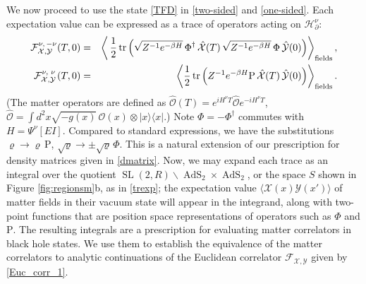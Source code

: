 \documentclass[11pt]{article}
\newcommand{\bea}{\begin{eqnarray}}
\newcommand{\eea}{\end{eqnarray}}
\newcommand{\lt}{\left}
\newcommand{\rt}{\right}
\newcommand*{\bra}[1]{\langle{#1}|}
\newcommand*{\ket}[1]{|{#1}\rangle}
\newcommand*{\corr}[1]{\langle{#1}\rangle}
\newcommand{\calF}{\mathcal{F}}
\newcommand{\calH}{\mathcal{H}}
\newcommand{\calO}{\mathcal{O}}
\newcommand{\calX}{\mathcal{X}}
\newcommand{\calY}{\mathcal{Y}}
\newcommand{\RR}{\mathbb{R}}
\DeclareMathOperator{\tr}{tr}
\DeclareMathOperator{\tSL}{\widetilde{\mathrm{SL}}}
\DeclareMathOperator{\tAdS}{\widetilde{AdS}}
\newcommand{\Rho}{\mathrm{P}}
\newcommand{\ov}{\over}
\newcommand{\p}{\partial}
\def\widetilde#1{#1}%
\def\RR{R}
\begin{document}
We now proceed to use the state \eqref{TFD} in \eqref{two-sided} and \eqref{one-sided}. Each expectation value can be expressed as a trace of operators acting on $\calH^{\nu}_{\p}$:
\bea
\label{2sided-tr}\tensor*{\calF}{*^{\nu,\, -\nu}_{\calX,\calY}}(T,0)&=&\lt \langle\,{1 \ov 2}\tr \left( \sqrt{Z^{-1}e^{-\beta H}}\,\Phi^{\dagger}\, \hat{\calX}(T)\, \sqrt{Z^{-1}e^{-\beta H}}\, \Phi \,\hat{\calY}(0) \right) \rt \rangle_{\text{fields}}, \\
\label{1sided-tr}
\tensor*{\calF}{*^{\nu,}_{\calX,}^{\nu}_{\calY}}(T,0)&=&\lt \langle{1 \ov 2}\tr \lt(Z^{-1}e^{-\beta H}\Rho\, \hat{\calX}(T)\,\hat{\calY}(0) \rt) \rt \rangle_{\text{fields}}.
\eea
(The matter operators are defined as $\hat{\calO}(T)=e^{iH^{\nu}T}\hat{\calO}e^{-iH^{\nu}T}$,\, $\hat{\calO}=\int d^2x \sqrt{-g(x)}\, \calO(x)\otimes \ket{x}\bra{x}$.) Note $\Phi=-\Phi^{\dagger}$ commutes with $H= \Psi^{\nu}[E I]$. Compared to standard expressions, we have the substitutions $\varrho \to \varrho\, \Rho$, $\sqrt{\varrho} \to \pm \sqrt{\varrho}\, \Phi$. This is a natural extension of our prescription for density matrices given in \eqref{dmatrix}. Now, we may expand each trace as an integral over the quotient $\tSL(2,\RR)\backslash \tAdS_2 \times \tAdS_2$, or the space $S$ shown in Figure \ref{fig:regionsm}b, as in \eqref{trexp}; the expectation value $\corr{\calX(x)\calY(x')}$ of matter fields in their vacuum state will appear in the integrand, along with two-point functions that are position space representations of operators such as $\Phi$ and $\Rho$. The resulting integrals are a prescription for evaluating matter correlators in black hole states. We use them to establish the equivalence of the matter correlators to analytic continuations of the Euclidean correlator $\calF_{\calX,\calY}$ given by \eqref{Euc_corr_1}. 

\end{document}
